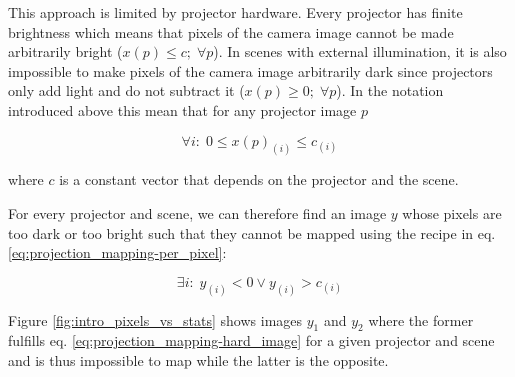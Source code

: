 This approach is limited by projector hardware. Every projector has finite brightness which means that pixels of the camera image cannot be made arbitrarily bright (\(x(p) \leq c;\; \forall p\)). In scenes with external illumination, it is also impossible to make pixels of the camera image arbitrarily dark since projectors only add light and do not subtract it (\(x(p) \geq 0;\; \forall p\)). In the notation introduced above this mean that for any projector image \(p\)

\begin{equation}
    \label{eq:projection_mapping-limitations}
    \forall i:\; 0 \leq x(p)_{(i)} \leq c_{(i)}
\end{equation}

where \(c\) is a constant vector that depends on the projector and the scene.

For every projector and scene, we can therefore find an image \(y\) whose pixels are too dark or too bright such that they cannot be mapped using the recipe in eq. \ref{eq:projection_mapping-per_pixel}:

\begin{equation}
    \label{eq:projection_mapping-hard_image}
    \exists i:\; y_{(i)} < 0 \lor y_{(i)} > c_{(i)}
\end{equation}

Figure \ref{fig:intro_pixels_vs_stats} shows images \(y_1\) and \(y_2\) where the former fulfills eq. \ref{eq:projection_mapping-hard_image} for a given projector and scene and is thus impossible to map while the latter is the opposite.

